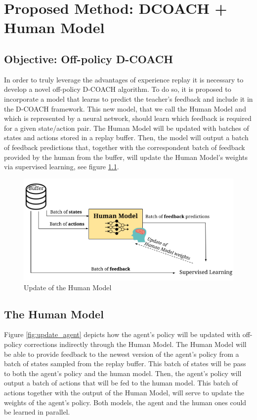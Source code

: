 \chapter{Proposed Method: DCOACH + Human Model}
\label{chapter:Proposed Method}

\section{Objective: Off-policy D-COACH}
\label{section:Objective: Off-policy D-COACH}


In order to truly leverage the advantages of experience replay it is necessary  to develop a novel off-policy D-COACH algorithm. To do so, it is proposed to incorporate a model that learns to predict the teacher’s feedback and include it in the D-COACH framework. This new model, that we call the Human Model and which is represented by a neural network, should learn which feedback is required for a given state/action pair. The Human Model will be updated with batches of states and actions stored in a replay buffer. Then, the model will output a batch of feedback predictions that, together with the correspondent batch of feedback provided by the human from the buffer, will update the Human Model's weights via supervised learning, see figure \ref{fig:update_human_model}. 


\begin{figure}[H]
    \centering
    \includegraphics[width=.7\textwidth]{figures/train_human_model.png}
    \caption{Update of the Human Model}
    \label{fig:update_human_model}
\end{figure}


\section{The Human Model}
\label{section:The Human Model}


Figure \ref{fig:update_agent} depicts how the agent's policy will be updated with off-policy corrections indirectly through the Human Model. The Human Model will be able to provide feedback to the newest version of the agent’s policy from a batch of states sampled from the replay buffer. This batch of states will be pass to both the agent's policy and the human model. Then, the agent's policy will output a batch of actions that will be fed to the human model. This batch of actions together with the output of the Human Model, will serve to update the weights of the agent's policy. Both models, the agent and the human ones could be learned in parallel.




